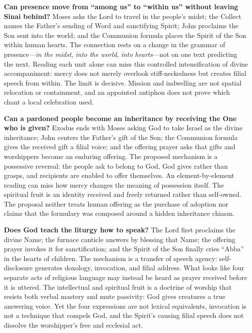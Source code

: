 \noindent\textbf{Can presence move from “among us” to “within us” without leaving Sinai behind?\enspace{}}
Moses asks the Lord to travel in the people's midst; the Collect names the Father's sending of Word and sanctifying Spirit; John proclaims the Son sent into the world; and the Communion formula places the Spirit of the Son within human hearts. The connection rests on a change in the grammar of presence---\emph{in the midst}, \emph{into the world}, \emph{into hearts}---not on one text predicting the next. Reading each unit alone can miss this controlled intensification of divine accompaniment: mercy does not merely overlook stiff-neckedness but creates filial speech from within. The limit is decisive. Mission and indwelling are not spatial relocation or containment, and an appointed antiphon does not prove which chant a local celebration used.

\noindent\textbf{Can a pardoned people become an inheritance by receiving the One who is given?\enspace{}}
Exodus ends with Moses asking God to take Israel as the divine inheritance; John centers the Father's gift of the Son; the Communion formula gives the received gift a filial voice; and the offering prayer asks that gifts and worshippers become an enduring offering. The proposed mechanism is a possessive reversal: the people ask to belong to God, God gives rather than grasps, and recipients are enabled to offer themselves. An element-by-element reading can miss how mercy changes the meaning of possession itself. The spiritual fruit is an identity received and freely returned rather than self-owned. The proposal neither treats human offering as the purchase of adoption nor claims that the formulary was composed around a hidden inheritance chiasm.

\noindent\textbf{Does God teach the liturgy how to speak?\enspace{}}
The Lord first proclaims the divine Name; the furnace canticle answers by blessing that Name; the offering prayer invokes it for sanctification; and the Spirit of the Son finally cries “Abba” in the hearts of children. The mechanism is a transfer of speech agency: self-disclosure generates doxology, invocation, and filial address. What looks like four separate acts of religious language may instead be heard as prayer received before it is uttered. The intellectual and spiritual fruit is a doctrine of worship that resists both verbal mastery and mute passivity: God gives creatures a true answering voice. Yet the four expressions are not lexical equivalents, invocation is not a technique that compels God, and the Spirit's causing filial speech does not dissolve the worshipper's free and ecclesial act.

